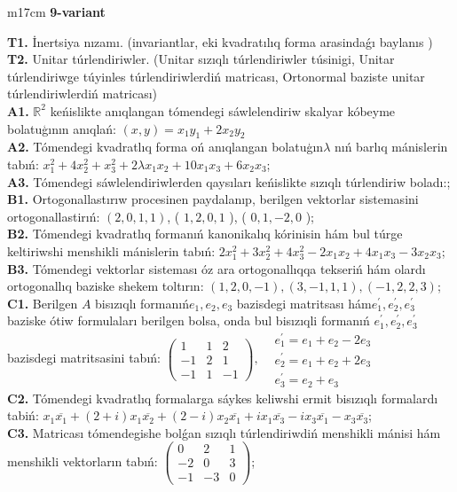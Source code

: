 \documentclass{article}
\begin{document}
\begin{tabular}{m{17cm}}
\textbf{9-variant}
\newline

\textbf{T1.} İnertsiya nızamı. (invariantlar,  eki kvadratılıq forma arasindaǵı baylanıs ) \\
\textbf{T2.} Unitar túrlendiriwler. (Unitar sızıqlı túrlendiriwler túsinigi,  Unitar túrlendiriwge túyinles túrlendiriwlerdiń matricası,   Ortonormal baziste unitar túrlendiriwlerdiń matricası) \\
\textbf{A1.} \(\mathbb{R}^{2}\) keńislikte anıqlangan tómendegi sáwlelendiriw skalyar kóbeyme bolatuģının anıqlań: \((x,y) = x_{1}y_{1} + 2x_{2}y_{2}\) \\
\textbf{A2.} Tómendegi kvadratlıq forma oń anıqlangan bolatuģın\(\lambda\) nıń barlıq mánislerin tabıń: \(x_{1}^{2} + 4x_{2}^{2} + x_{3}^{2} + 2\lambda x_{1}x_{2} + 10x_{1}x_{3} + 6x_{2}x_{3}\); \\
\textbf{A3.} Tómendegi sáwlelendiriwlerden qaysıları keńislikte sızıqlı túrlendiriw boladı:; \\
\textbf{B1.} Ortogonallastırıw procesinen paydalanıp, berilgen vektorlar sistemasini ortogonallastirıń: \((2,0,1,1)\), ( \(1,2,0,1\) ), ( \(0,1, - 2,0\) ); \\
\textbf{B2.} Tómendegi kvadratlıq formanıń kanonikalıq kórinisin hám bul túrge keltiriwshi menshikli mánislerin tabıń: \(2x_{1}^{2} + 3x_{2}^{2} + 4x_{3}^{2} - 2x_{1}x_{2} + 4x_{1}x_{3} - 3x_{2}x_{3}\); \\
\textbf{B3.} Tómendegi vektorlar sisteması óz ara ortogonallıqqa tekseriń hám olardı ortogonallıq baziske shekem toltırın: \((1,2,0, - 1),(3, - 1,1,1),( - 1,2,2,3)\); \\
\textbf{C1.} Berilgen \(A\) bisızıqlı formanıń\(e_{1},e_{2},e_{3}\) bazisdegi matritsası hám\(e_{1}^{'},e_{2}^{'},e_{3}^{'}\) baziske ótiw formulaları berilgen bolsa, onda bul bisızıqli formanıń \(e_{1}^{'},e_{2}^{'},e_{3}^{'}\) bazisdegi matritsasini tabıń: \(\begin{pmatrix} 1 & 1 & 2 \\  - 1 & 2 & 1 \\  - 1 & 1 & - 1 \end{pmatrix},\begin{matrix}  & e_{1}^{'} = e_{1} + e_{2} - 2e_{3} \\  & e_{2}^{'} = e_{1} + e_{2} + 2e_{3} \\  & e_{3}^{'} = e_{2} + e_{3} \end{matrix}\) \\
\textbf{C2.} Tómendegi kvadratlıq formalarga sáykes keliwshi ermit bisızıqlı formalardı tabiń: \(x_{1}\overline{x_{1}} + (2 + i)x_{1}\overline{x_{2}} + (2 - i)x_{2}\overline{x_{1}} + ix_{1}\overline{x_{3}} - ix_{3}\overline{x_{1}} - x_{3}\overline{x_{3}}\); \\
\textbf{C3.} Matricası tómendegishe bolǵan sızıqlı túrlendiriwdiń menshikli mánisi hám menshikli vektorların tabıń: \(\begin{pmatrix} 0 & 2 & 1 \\  - 2 & 0 & 3 \\  - 1 & - 3 & 0 \end{pmatrix}\); \\


\end{tabular}
\end{document}

